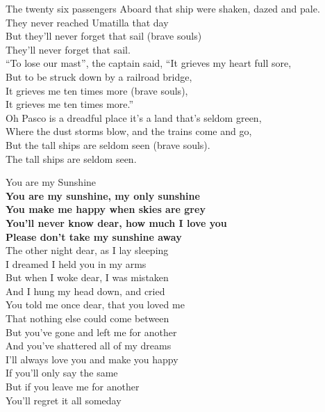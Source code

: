\documentclass[letterpaper,9pt]{article}
\begin{document}
The twenty six passengers Aboard that ship were shaken, dazed and pale. \\
They never reached Umatilla that day \\
But they'll never forget that sail (brave souls) \\
They'll never forget that sail. \\

“To lose our mast”, the captain said, “It grieves my heart full sore, \\
But to be struck down by a railroad bridge, \\
It grieves me ten times more (brave souls), \\
It grieves me ten times more.” \\

Oh Pasco is a dreadful place it's a land that's seldom green, \\
Where the dust storms blow, and the trains come and go, \\
But the tall ships are seldom seen (brave souls). \\
The tall ships are seldom seen. \\

\newpage
{}
\Huge
You are my Sunshine\\

\huge
\textbf{You are my sunshine, my only sunshine \\
You make me happy when skies are grey \\
You'll never know dear, how much I love you \\
Please don't take my sunshine away} \\

The other night dear, as  I lay sleeping \\
I dreamed I held you in my arms \\
But when I woke dear, I was mistaken \\
And I hung my head down, and cried \\

You told me once dear, that you loved me \\
That nothing else could come between \\
But you've gone and left me for another \\
And you've shattered all of my dreams \\

I'll always love you and make you happy \\
If you'll only say the same \\
But if you leave me for another \\
You'll regret it all someday \\
\end{document}
